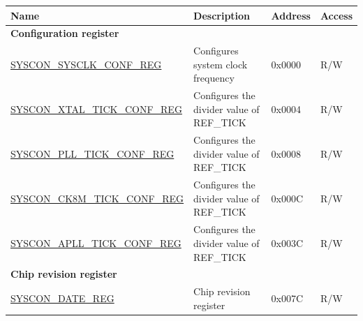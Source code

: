 \begin{longtable}{ | p{6cm} | p{7.2cm} | p{1.3cm} | p{1cm} | }
    \hline\rowcolor{lightgray}
    Name & Description &  Address & Access \\ \hline
    \endhead
    \multicolumn{4}{|l|}{\textbf{Configuration register}} \\ \hline
    \hyperref[regdesc:SYSCONSYSCLKCONFREG]{SYSCON\_SYSCLK\_CONF\_REG} & Configures system clock frequency & 0x0000 & R/W \\ \hline
    \hyperref[regdesc:SYSCONXTALTICKCONFREG]{SYSCON\_XTAL\_TICK\_CONF\_REG} & Configures the divider value of REF\_TICK & 0x0004 & R/W \\ \hline
    \hyperref[regdesc:SYSCONPLLTICKCONFREG]{SYSCON\_PLL\_TICK\_CONF\_REG} & Configures the divider value of REF\_TICK & 0x0008 & R/W \\ \hline
    \hyperref[regdesc:SYSCONCK8MTICKCONFREG]{SYSCON\_CK8M\_TICK\_CONF\_REG} & Configures the divider value of REF\_TICK & 0x000C & R/W \\ \hline
    \hyperref[regdesc:SYSCONAPLLTICKCONFREG]{SYSCON\_APLL\_TICK\_CONF\_REG} & Configures the divider value of REF\_TICK & 0x003C & R/W \\ \hline
    \multicolumn{4}{|l|}{\textbf{Chip revision register}} \\ \hline
    \hyperref[regdesc:SYSCONDATEREG]{SYSCON\_DATE\_REG} & Chip revision register & 0x007C & R/W \\ \hline
    \end{longtable}
